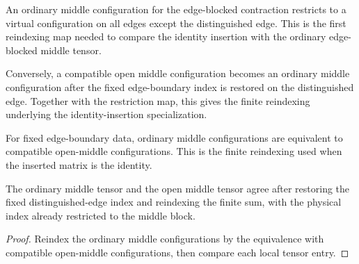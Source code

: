 \begin{definition}%
    \label{def:peps_edgeMiddleConfigToOpenMiddleConfig}
    \leanok
    An ordinary middle configuration for the edge-blocked contraction restricts
    to a virtual configuration on all edges except the distinguished edge. This
    is the first reindexing map needed to compare the identity insertion with
    the ordinary edge-blocked middle tensor.
\end{definition}

\begin{definition}%
    \label{def:peps_edgeOpenMiddleConfigToMiddleConfig}
    \leanok
    Conversely, a compatible open middle configuration becomes an ordinary
    middle configuration after the fixed edge-boundary index is restored on the
    distinguished edge. Together with the restriction map, this gives the
    finite reindexing underlying the identity-insertion specialization.
\end{definition}

\begin{definition}%
    \label{def:peps_edgeMiddleConfigEquivOpenMiddleConfig}
    \leanok
    For fixed edge-boundary data, ordinary middle configurations are equivalent
    to compatible open-middle configurations. This is the finite reindexing
    used when the inserted matrix is the identity.
\end{definition}

\begin{theorem}%
    \label{thm:peps_edgeMiddleWeightOn_eq_edgeOpenMiddleWeightOn}
    \leanok
    The ordinary middle tensor and the open middle tensor agree after restoring
    the fixed distinguished-edge index and reindexing the finite sum, with the
    physical index already restricted to the middle block.
\end{theorem}
\begin{proof}\leanok
    Reindex the ordinary middle configurations by the equivalence with
    compatible open-middle configurations, then compare each local tensor entry.
\end{proof}

